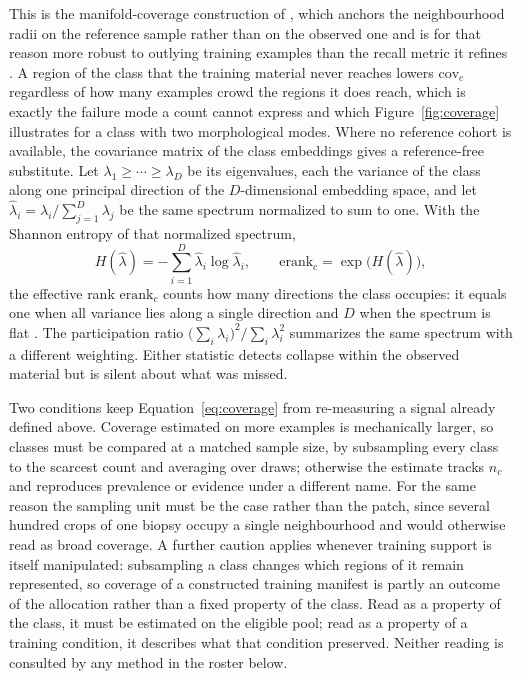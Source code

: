\documentclass[11pt]{article}
\begin{document}
\noindent This is the manifold-coverage construction of \citet{naeem2020reliableFidelity}, which anchors the neighbourhood radii on the reference sample rather than on the observed one and is for that reason more robust to outlying training examples than the recall metric it refines \citep{kynkaanniemi2019improvedPrecision}. A region of the class that the training material never reaches lowers $\mathrm{cov}_c$ regardless of how many examples crowd the regions it does reach, which is exactly the failure mode a count cannot express and which Figure~\ref{fig:coverage} illustrates for a class with two morphological modes. Where no reference cohort is available, the covariance matrix of the class embeddings gives a reference-free substitute. Let $\lambda_1\geq\cdots\geq\lambda_D$ be its eigenvalues, each the variance of the class along one principal direction of the $D$-dimensional embedding space, and let $\widehat{\lambda}_i=\lambda_i/\sum_{j=1}^{D}\lambda_j$ be the same spectrum normalized to sum to one. With the Shannon entropy of that normalized spectrum,
\begin{equation}
  H(\widehat{\lambda})=-\sum_{i=1}^{D}\widehat{\lambda}_i\log\widehat{\lambda}_i,
  \qquad
  \mathrm{erank}_c=\exp\bigl(H(\widehat{\lambda})\bigr),
  \label{eq:effective-rank}
\end{equation}
\noindent the effective rank $\mathrm{erank}_c$ counts how many directions the class occupies: it equals one when all variance lies along a single direction and $D$ when the spectrum is flat \citep{roy2007effectiveRank}. The participation ratio $\bigl(\sum_i\lambda_i\bigr)^2/\sum_i\lambda_i^2$ summarizes the same spectrum with a different weighting. Either statistic detects collapse within the observed material but is silent about what was missed.

Two conditions keep Equation~\eqref{eq:coverage} from re-measuring a signal already defined above. Coverage estimated on more examples is mechanically larger, so classes must be compared at a matched sample size, by subsampling every class to the scarcest count and averaging over draws; otherwise the estimate tracks $n_c$ and reproduces prevalence or evidence under a different name. For the same reason the sampling unit must be the case rather than the patch, since several hundred crops of one biopsy occupy a single neighbourhood and would otherwise read as broad coverage. A further caution applies whenever training support is itself manipulated: subsampling a class changes which regions of it remain represented, so coverage of a constructed training manifest is partly an outcome of the allocation rather than a fixed property of the class. Read as a property of the class, it must be estimated on the eligible pool; read as a property of a training condition, it describes what that condition preserved. Neither reading is consulted by any method in the roster below.
\end{document}
